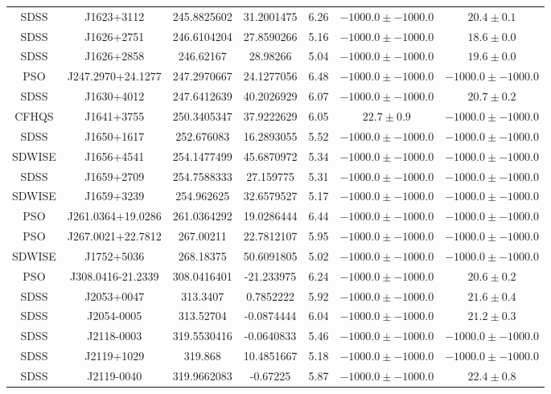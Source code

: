 \begin{table}
\begin{tabular}{ccccccc}
SDSS & J1623+3112 & 245.8825602 & 31.2001475 & 6.26 & $-1000.0\pm-1000.0$ & $  20.4\pm  0.1$ \\
SDSS & J1626+2751 & 246.6104204 & 27.8590266 & 5.16 & $-1000.0\pm-1000.0$ & $  18.6\pm  0.0$ \\
SDSS & J1626+2858 & 246.62167 & 28.98266 & 5.04 & $-1000.0\pm-1000.0$ & $  19.6\pm  0.0$ \\
PSO & J247.2970+24.1277 & 247.2970667 & 24.1277056 & 6.48 & $-1000.0\pm-1000.0$ & $-1000.0\pm-1000.0$ \\
SDSS & J1630+4012 & 247.6412639 & 40.2026929 & 6.07 & $-1000.0\pm-1000.0$ & $  20.7\pm  0.2$ \\
CFHQS & J1641+3755 & 250.3405347 & 37.9222629 & 6.05 & $  22.7\pm  0.9$ & $-1000.0\pm-1000.0$ \\
SDSS & J1650+1617 & 252.676083 & 16.2893055 & 5.52 & $-1000.0\pm-1000.0$ & $-1000.0\pm-1000.0$ \\
SDWISE & J1656+4541 & 254.1477499 & 45.6870972 & 5.34 & $-1000.0\pm-1000.0$ & $-1000.0\pm-1000.0$ \\
SDSS & J1659+2709 & 254.7588333 & 27.159775 & 5.31 & $-1000.0\pm-1000.0$ & $-1000.0\pm-1000.0$ \\
SDWISE & J1659+3239 & 254.962625 & 32.6579527 & 5.17 & $-1000.0\pm-1000.0$ & $-1000.0\pm-1000.0$ \\
PSO & J261.0364+19.0286 & 261.0364292 & 19.0286444 & 6.44 & $-1000.0\pm-1000.0$ & $-1000.0\pm-1000.0$ \\
PSO & J267.0021+22.7812 & 267.00211 & 22.7812107 & 5.95 & $-1000.0\pm-1000.0$ & $-1000.0\pm-1000.0$ \\
SDWISE & J1752+5036 & 268.18375 & 50.6091805 & 5.02 & $-1000.0\pm-1000.0$ & $-1000.0\pm-1000.0$ \\
PSO & J308.0416-21.2339 & 308.0416401 & -21.233975 & 6.24 & $-1000.0\pm-1000.0$ & $  20.6\pm  0.2$ \\
SDSS & J2053+0047 & 313.3407 & 0.7852222 & 5.92 & $-1000.0\pm-1000.0$ & $  21.6\pm  0.4$ \\
SDSS & J2054-0005 & 313.52704 & -0.0874444 & 6.04 & $-1000.0\pm-1000.0$ & $  21.2\pm  0.3$ \\
SDSS & J2118-0003 & 319.5530416 & -0.0640833 & 5.46 & $-1000.0\pm-1000.0$ & $-1000.0\pm-1000.0$ \\
SDSS & J2119+1029 & 319.868 & 10.4851667 & 5.18 & $-1000.0\pm-1000.0$ & $-1000.0\pm-1000.0$ \\
SDSS & J2119-0040 & 319.9662083 & -0.67225 & 5.87 & $-1000.0\pm-1000.0$ & $  22.4\pm  0.8$ \\

\end{tabular}
\end{table}
